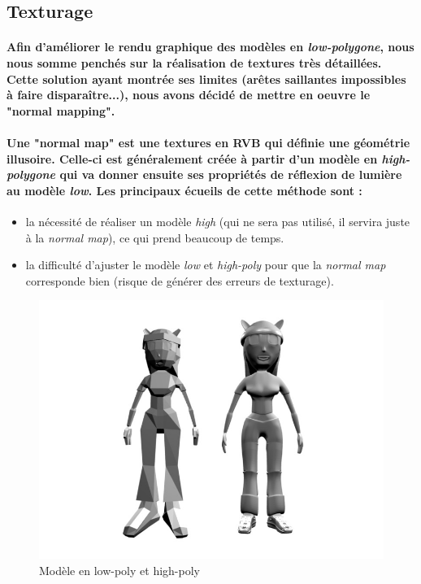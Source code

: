 \subsection{Texturage}

\paragraph{Afin d'améliorer le rendu graphique des modèles en \textit{low-polygone}, nous nous somme penchés sur la réalisation de textures très détaillées. Cette solution ayant montrée ses limites (arêtes saillantes impossibles à faire disparaître...), nous avons décidé de mettre en oeuvre le "\textbf{normal mapping}".}

\paragraph{Une "\textbf{normal map}" est une textures en RVB qui définie une géométrie illusoire. Celle-ci est généralement créée à partir d'un modèle en \textit{high-polygone} qui va donner ensuite ses propriétés de réflexion de lumière au modèle \textit{low}.
Les principaux écueils de cette méthode sont :}

\begin{itemize}
\setlength{\itemsep}{20pt}
	\item la nécessité de réaliser un modèle \textit{high} (qui ne sera pas utilisé, il servira juste à la \textit{normal map}), ce qui prend beaucoup de temps.
 	\item la difficulté d'ajuster le modèle \textit{low} et \textit{high-poly} pour que la \textit{normal map} corresponde bien (risque de générer des erreurs de texturage).
\end{itemize}


\begin{figure}[h]
	\center
	\includegraphics[scale=0.5]{visuel/low_poly_et_high_poly.jpg}
	\caption{Modèle en low-poly et high-poly}
\end{figure}


